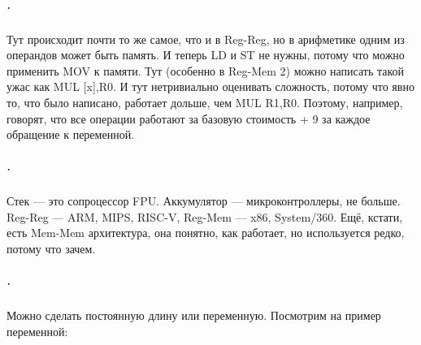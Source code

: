\documentclass{article}
\begin{document}
    \subparagraph{.}
    \begin{center}
    \end{center}
    Тут происходит почти то же самое, что и в Reg-Reg, но в арифметике одним из операндов может быть память. И теперь LD и ST не нужны, потому что можно применить MOV к памяти. Тут (особенно в Reg-Mem 2) можно написать такой ужас как MUL [x],R0. И тут нетривиально оценивать сложность, потому что явно то, что было написано, работает дольше, чем MUL R1,R0. Поэтому, например, говорят, что все операции работают за базовую стоимость + 9 за каждое обращение к переменной.
    \subparagraph{.}
    Стек --- это сопроцессор FPU. Аккумулятор --- микроконтроллеры, не больше. Reg-Reg --- ARM, MIPS, RISC-V, Reg-Mem --- x86, System/360. Ещё, кстати, есть Mem-Mem архитектура, она понятно, как работает, но используется редко, потому что зачем.
    \subparagraph{.}
    Можно сделать постоянную длину или переменную. Посмотрим на пример переменной:
\end{document}
